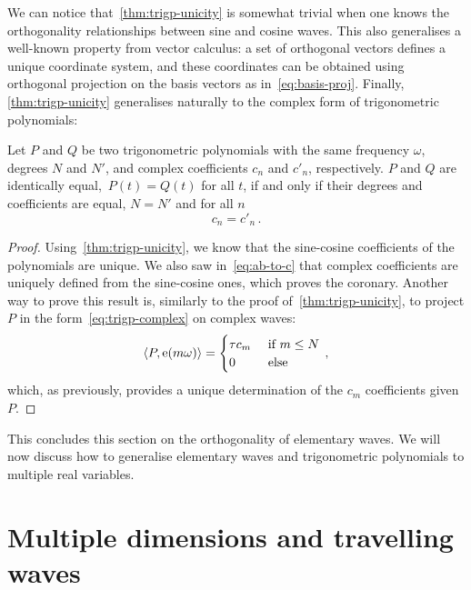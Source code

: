 We can notice that~\cref{thm:trigp-unicity} is somewhat trivial when one knows the
orthogonality relationships between sine and cosine waves. This also generalises a
well-known property from vector calculus: a set of orthogonal vectors defines a unique
coordinate system, and these coordinates can be obtained using orthogonal projection on
the basis vectors as in~\cref{eq:basis-proj}. Finally, \cref{thm:trigp-unicity}
generalises naturally to the complex form of trigonometric polynomials:
\begin{corollary}
  Let $P$ and $Q$ be two trigonometric polynomials with the same frequency $\omega$,
  degrees $N$ and $N'$, and complex coefficients $c_n$ and $c'_n$, respectively. $P$ and
  $Q$ are identically equal,~\ie $P(t)=Q(t)$ for all $t$, if and only if their degrees and
  coefficients are equal, \ie $N=N'$ and for all $n$
  \begin{equation}
    c_n=c'_n\,.
  \end{equation}
\end{corollary}
\begin{proof}
  Using~\cref{thm:trigp-unicity}, we know that the sine-cosine coefficients of the
  polynomials are unique. We also saw in~\cref{eq:ab-to-c} that complex coefficients are
  uniquely defined from the sine-cosine ones, which proves the coronary. Another way to
  prove this result is, similarly to the proof of~\cref{thm:trigp-unicity}, to project $P$
  in the form~\cref{eq:trigp-complex} on complex waves:
  \begin{equation}
    \braket{P,\operatorname{e}(m\omega)}=
    \begin{cases}
      \tau c_m&~\text{if}~m\leq N\\
      0&~\text{else}
    \end{cases}\,,
  \end{equation}
  which, as previously, provides a unique determination of the $c_m$ coefficients given
  $P$.
\end{proof}
This concludes this section on the orthogonality of elementary waves. We will now discuss
how to generalise elementary waves and trigonometric polynomials to multiple real
variables.
\section{Multiple dimensions and travelling waves}
